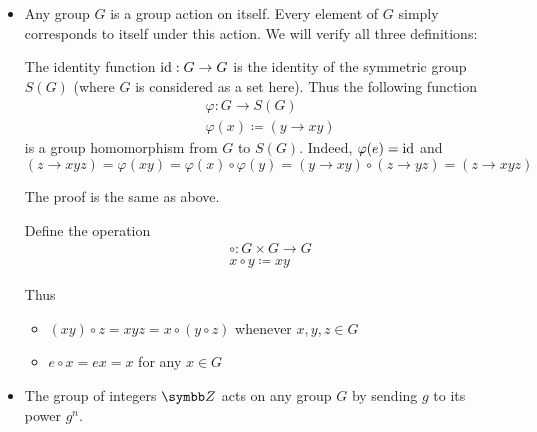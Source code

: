 \begin{example}\label{ex:group_actions}
  \begin{itemize}\mbox{}
    \item Any group \( G \) is a group action on itself. Every element of \( G \) simply corresponds to itself under this action. We will verify all three definitions:
    \begin{description}
       The identity function \( \operatorname{id}: G \to G \) is the identity of the symmetric group \( S(G) \) (where \( G \) is considered as a set here). Thus the following function
      \begin{align*}
        &\varphi: G \to S(G) \\
        &\varphi(x) \coloneqq (y \to xy)
      \end{align*}
      is a group homomorphism from \( G \) to \( S(G) \). Indeed, \( \varphi(e) = \operatorname{id} \) and
      \begin{equation*}
        (z \to xyz) = \varphi(xy) = \varphi(x) \circ \varphi(y) = (y \to xy) \circ (z \to yz) = (z \to xyz)
      \end{equation*}

       The proof is the same as above.

       Define the operation
      \begin{align*}
        &\circ: G \times G \to G \\
        &x \circ y \coloneqq xy
      \end{align*}

      Thus
      \begin{itemize}
        \item \( (x y) \circ z = xyz = x \circ (y \circ z) \) whenever \( x, y, z \in G \)
        \item \( e \circ x = ex = x \) for any \( x \in G \)
      \end{itemize}
    \end{description}

    \item The group of integers \( \Z \) acts on any group \( G \) by sending \( g \) to its power \( g^n \).
  \end{itemize}
\end{example}
